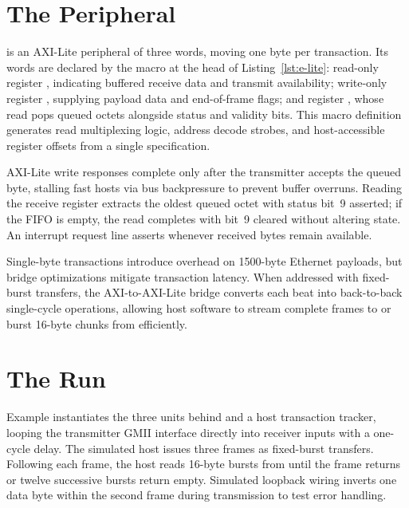 \documentclass[journal,9pt]{IEEEtran}
\newcommand{\ethpart}[3]{%
}
\begin{document}
\ethpart{rxstate}{The receiver's state.}{lst:e-rxstate}

\ethpart{rx}{The receiver's step.}{lst:e-rx}

\section{The Peripheral}
\label{sec:e-lite}

 is an AXI-Lite peripheral of three words, moving one byte per
transaction. Its words are declared by the  macro at the head
of Listing~\ref{lst:e-lite}: read-only register , indicating
buffered receive data and transmit availability; write-only register
, supplying payload data and end-of-frame flags; and
register , whose read pops queued octets alongside status and
validity bits. This macro definition generates read multiplexing logic,
address decode strobes, and host-accessible register offsets from a single
specification.

AXI-Lite write responses complete only after the transmitter accepts the
queued byte, stalling fast hosts via bus backpressure to prevent buffer
overruns. Reading the receive register extracts the oldest queued octet
with status bit~9 asserted; if the FIFO is empty, the read completes with
bit~9 cleared without altering state. An interrupt request line asserts
whenever received bytes remain available.

Single-byte transactions introduce overhead on 1500-byte Ethernet payloads,
but bridge optimizations mitigate transaction latency. When addressed with
fixed-burst transfers, the AXI-to-AXI-Lite bridge converts each beat into
back-to-back single-cycle operations, allowing host software to stream
complete frames to  or burst 16-byte chunks from
 efficiently.

\ethpart{lite}{The peripheral.}{lst:e-lite}

\section{The Run}
\label{sec:e-run}

Example  instantiates the three units behind
 and a host transaction tracker, looping the
transmitter GMII interface directly into receiver inputs with a one-cycle
delay. The simulated host issues three frames as fixed-burst transfers.
Following each frame, the host reads 16-byte bursts from  until
the frame returns or twelve successive bursts return empty. Simulated
loopback wiring inverts one data byte within the second frame during
transmission to test error handling.
\end{document}
